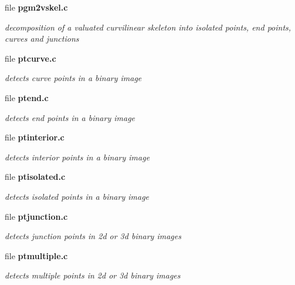 \begin{CompactItemize}
\item 
file {\bf pgm2vskel.c}
\begin{CompactList}\small\item\em decomposition of a valuated curvilinear skeleton into isolated points, end points, curves and junctions \item\end{CompactList}

\item 
file {\bf ptcurve.c}
\begin{CompactList}\small\item\em detects curve points in a binary image \item\end{CompactList}

\item 
file {\bf ptend.c}
\begin{CompactList}\small\item\em detects end points in a binary image \item\end{CompactList}

\item 
file {\bf ptinterior.c}
\begin{CompactList}\small\item\em detects interior points in a binary image \item\end{CompactList}

\item 
file {\bf ptisolated.c}
\begin{CompactList}\small\item\em detects isolated points in a binary image \item\end{CompactList}

\item 
file {\bf ptjunction.c}
\begin{CompactList}\small\item\em detects junction points in 2d or 3d binary images \item\end{CompactList}

\item 
file {\bf ptmultiple.c}
\begin{CompactList}\small\item\em detects multiple points in 2d or 3d binary images \item\end{CompactList}


\end{CompactItemize}
